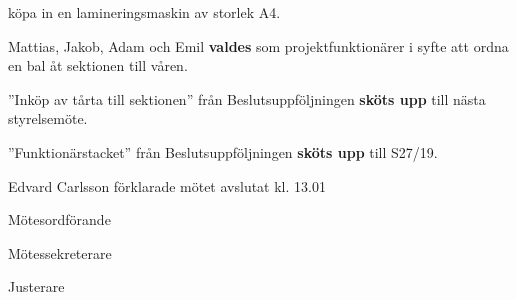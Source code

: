 \documentclass[10pt]{article}
\def\mo{Edvard Carlsson}
\def\ms{Mattias Lundström}
\def\ji{Davida Åström}
\begin{document}
\begin{paragrafer}

\Mba köpa in en lamineringsmaskin av storlek A4. 

Mattias, Jakob, Adam och Emil \textbf{valdes} som projektfunktionärer i syfte att ordna en bal åt sektionen till våren. 

''Inköp av tårta till sektionen'' från Beslutsuppföljningen \textbf{sköts upp} till nästa styrelsemöte. 

''Funktionärstacket'' från Beslutsuppföljningen \textbf{sköts upp} till S27/19.

{\mo} förklarade mötet avslutat kl. 13.01
\end{paragrafer}

\hidesignfoot
\begin{signatures}{3}
\signature{\mo}{Mötesordförande}
\signature{\ms}{Mötessekreterare}
\signature{\ji}{Justerare}
\end{signatures}
\end{document}

